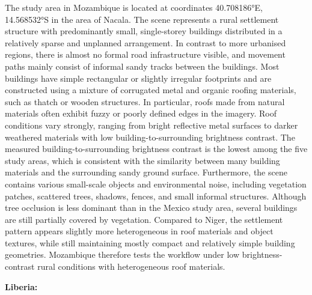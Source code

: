 The study area in Mozambique is located at coordinates 40.708186°E, 14.568532°S in the area of Nacala. The scene represents a rural settlement structure with predominantly small, single-storey buildings distributed in a relatively sparse and unplanned arrangement. In contrast to more urbanised regions, there is almost no formal road infrastructure visible, and movement paths mainly consist of informal sandy tracks between the buildings. Most buildings have simple rectangular or slightly irregular footprints and are constructed using a mixture of corrugated metal and organic roofing materials, such as thatch or wooden structures. In particular, roofs made from natural materials often exhibit fuzzy or poorly defined edges in the imagery. Roof conditions vary strongly, ranging from bright reflective metal surfaces to darker weathered materials with low building-to-surrounding brightness contrast. The measured building-to-surrounding brightness contrast is the lowest among the five study areas, which is consistent with the similarity between many building materials and the surrounding sandy ground surface. Furthermore, the scene contains various small-scale objects and environmental noise, including vegetation patches, scattered trees, shadows, fences, and small informal structures. Although tree occlusion is less dominant than in the Mexico study area, several buildings are still partially covered by vegetation. Compared to Niger, the settlement pattern appears slightly more heterogeneous in roof materials and object textures, while still maintaining mostly compact and relatively simple building geometries. Mozambique therefore tests the workflow under low brightness-contrast rural conditions with heterogeneous roof materials.

\textbf{Liberia:}

